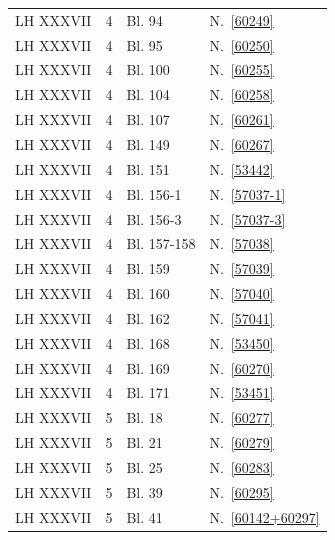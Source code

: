 \begin{longtable}{llll}
LH XXXVII & 4 & Bl. 94 & N.~\ref{60249}\\

LH XXXVII & 4 & Bl. 95 & N.~\ref{60250}\\

LH XXXVII & 4 & Bl. 100 & N.~\ref{60255}\\

LH XXXVII & 4 & Bl. 104 & N.~\ref{60258}\\

LH XXXVII & 4 & Bl. 107 & N.~\ref{60261}\\

LH XXXVII & 4 & Bl. 149\textendash 150 & N.~\ref{60267}\\

LH XXXVII & 4 & Bl. 151 & N.~\ref{53442}\\

LH XXXVII & 4 & Bl. 156-1 & N.~\ref{57037-1}\\
LH XXXVII & 4 & Bl. 156-3 & N.~\ref{57037-3}\\

LH XXXVII & 4 & Bl. 157-158 & N.~\ref{57038}\\

LH XXXVII & 4 & Bl. 159 & N.~\ref{57039}\\

LH XXXVII & 4 & Bl. 160\textendash 161 & N.~\ref{57040}\\

LH XXXVII & 4 & Bl. 162\textendash 163 & N.~\ref{57041}\\

LH XXXVII & 4 & Bl. 168 & N.~\ref{53450}\\

LH XXXVII & 4 & Bl. 169\textendash 170 & N.~\ref{60270}\\

LH XXXVII & 4 & Bl. 171 & N.~\ref{53451}\\

LH XXXVII & 5 & Bl. 18 & N.~\ref{60277}\\

LH XXXVII & 5 & Bl. 21 & N.~\ref{60279}\\

LH XXXVII & 5 & Bl. 25 & N.~\ref{60283}\\


LH XXXVII & 5 & Bl. 39 & N.~\ref{60295}\\


LH XXXVII & 5 & Bl. 41 & N.~\ref{60142+60297}\\


\end{longtable}
